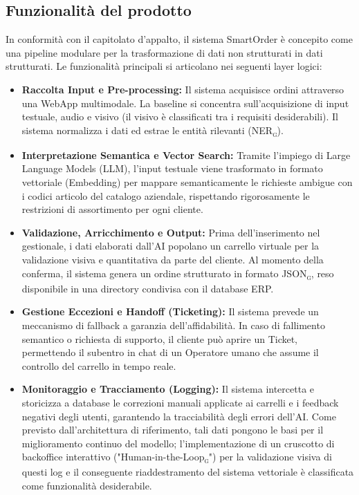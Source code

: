 \documentclass[a4paper, 11pt, oneside]{scrartcl} %
\begin{document}
\subsection{Funzionalità del prodotto}
In conformità con il capitolato d'appalto, il sistema SmartOrder è concepito come una pipeline modulare per la trasformazione di dati non strutturati in dati strutturati. Le funzionalità principali si articolano nei seguenti layer logici:
\begin{itemize}
    \item \textbf{Raccolta Input e Pre-processing:} Il sistema acquisisce ordini attraverso una WebApp multimodale. La baseline si concentra sull'acquisizione di input testuale, audio e visivo (il visivo è classificati tra i requisiti desiderabili). Il sistema normalizza i dati ed estrae le entità rilevanti (NER\textsubscript{\textsc{g}}).
    \item \textbf{Interpretazione Semantica e Vector Search:} Tramite l'impiego di Large Language Models (LLM), l'input testuale viene trasformato in formato vettoriale (Embedding) per mappare semanticamente le richieste ambigue con i codici articolo del catalogo aziendale, rispettando rigorosamente le restrizioni di assortimento per ogni cliente.
    \item \textbf{Validazione, Arricchimento e Output:} Prima dell'inserimento nel gestionale, i dati elaborati dall'AI popolano un carrello virtuale per la validazione visiva e quantitativa da parte del cliente. Al momento della conferma, il sistema genera un ordine strutturato in formato JSON\textsubscript{\textsc{g}}, reso disponibile in una directory condivisa con il database ERP.
    \item \textbf{Gestione Eccezioni e Handoff (Ticketing):} Il sistema prevede un meccanismo di fallback a garanzia dell'affidabilità. In caso di fallimento semantico o richiesta di supporto, il cliente può aprire un Ticket, permettendo il subentro in chat di un Operatore umano che assume il controllo del carrello in tempo reale.
    \item \textbf{Monitoraggio e Tracciamento (Logging):} Il sistema intercetta e storicizza a database le correzioni manuali applicate ai carrelli e i feedback negativi degli utenti, garantendo la tracciabilità degli errori dell'AI. Come previsto dall'architettura di riferimento, tali dati pongono le basi per il miglioramento continuo del modello; l'implementazione di un cruscotto di backoffice interattivo ("Human-in-the-Loop\textsubscript{\textsc{g}}") per la validazione visiva di questi log e il conseguente riaddestramento del sistema vettoriale è classificata come funzionalità desiderabile.
\end{itemize}
\end{document}
